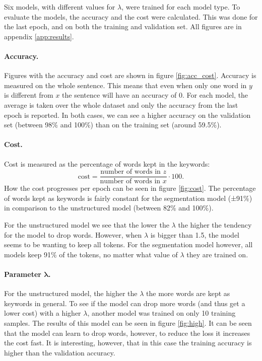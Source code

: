 Six models, with different values for $\lambda$, were trained for each model type.
To evaluate the models, the accuracy and the cost were calculated.
This was done for the last epoch, and on both the training and validation set.
All figures are in appendix \ref{app:results}.

\paragraph{Accuracy.}
Figures with the accuracy and cost are shown in figure \ref{fig:acc_cost}.
Accuracy is measured on the whole sentence. This means that even when only one word in $y$ is different from $x$ the sentence will have an accuracy of 0.
For each model, the average is taken over the whole dataset and only the accuracy from the last epoch is reported.
In both cases, we can see a higher accuracy on the validation set (between 98\% and 100\%) than on the training set (around 59.5\%). 

\paragraph{Cost.}
Cost is measured as the percentage of words kept in the keywords:
\begin{equation}
    \label{eq:cost_perc}
    \text{cost} = \frac{\text{number of words in } z}{\text{number of words in } x} \cdot 100.
\end{equation}
How the cost progresses per epoch can be seen in figure \ref{fig:cost}.
The percentage of words kept as keywords is fairly constant for the segmentation model (±91\%) in comparison to the unstructured model (between 82\% and 100\%). 

For the unstructured model we see that the lower the $\lambda$ the higher the tendency for the model to drop words. 
However, when $\lambda$ is bigger than 1.5, the model seems to be wanting to keep all tokens.
For the segmentation model however, all models keep 91\% of the tokens, no matter what value of $\lambda$ they are trained on.

\paragraph{Parameter $\boldsymbol{\lambda}$.}
For the unstructured model, the higher the $\lambda$ the more words are kept as keywords in general.
To see if the model can drop more words (and thus get a lower cost) with a higher $\lambda$, another model was trained on only 10 training samples. 
The results of this model can be seen in figure \ref{fig:high}.
It can be seen that the model can learn to drop words, however, to reduce the loss it increases the cost fast.
It is interesting, however, that in this case the training accuracy is higher than the validation accuracy.

